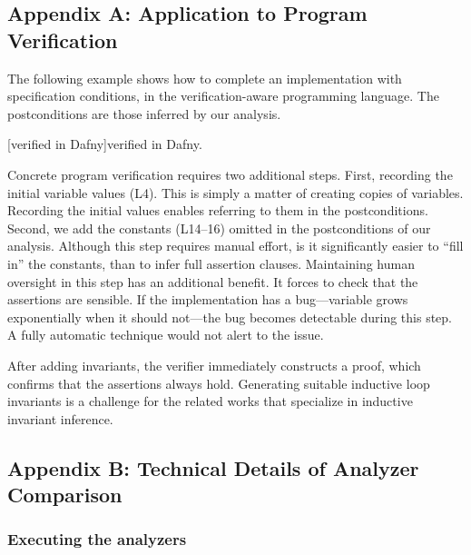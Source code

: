
\subsection{Appendix A: Application to Program Verification}
\label{app:sec:verified}

The following example shows how to complete an implementation with specification
conditions, in the verification-aware  programming language. The
postconditions are those inferred by our analysis.

\begin{center}
    \begin{minipage}{\textwidth}
        \captionsetup{type=lstlisting}
        [\exname verified in Dafny]{\exname verified in Dafny.}
        \label{lst:dafny-ex}
    \end{minipage}
\end{center}

Concrete program verification requires two additional steps. First, recording
the initial variable values (L4). This is simply a matter of creating copies of
variables. Recording the initial values enables referring to them in the
postconditions. Second, we add the constants (L14--16) omitted in the
postconditions of our analysis. Although this step requires manual effort, is it
significantly easier to \enquote{fill in} the constants, than to infer full
assertion clauses. Maintaining human oversight in this step has an additional
benefit. It forces to check that the assertions are sensible. If the
implementation has a bug---\eg variable grows exponentially when it should
not---the bug becomes detectable during this step. A fully automatic technique
would not alert to the issue.

After adding invariants, the  verifier immediately constructs a proof,
which confirms that the assertions always hold. Generating suitable inductive
loop invariants is a challenge for the related works that specialize in
inductive invariant inference.


\subsection{Appendix B: Technical Details of Analyzer Comparison}
\label{app:sec:comparison}

\subsubsection{Executing the analyzers}\label{subsec:analyzers}

